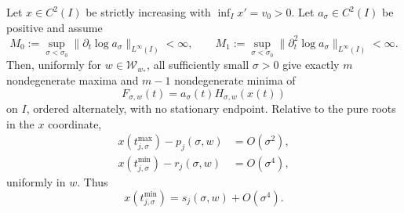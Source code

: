 \begin{theorem}
\label{thm:exactmfull-slow-factor}
Let \(x\in C^2(I)\) be strictly increasing with
\(\inf_Ix'=v_0>0\).  Let \(a_\sigma\in C^2(I)\) be positive and assume
\begin{equation}
 M_0:=\sup_{\sigma<\sigma_0}
 \|\partial_t\log a_\sigma\|_{L^\infty(I)}<\infty,
 \qquad
 M_1:=\sup_{\sigma<\sigma_0}
 \|\partial_t^2\log a_\sigma\|_{L^\infty(I)}<\infty.
 \label{eq:exactmfull-slow-factor-hypothesis}
\end{equation}
Then, uniformly for \(w\in\mathcal W_{w_*}\), all sufficiently small
\(\sigma>0\) give exactly \(m\) nondegenerate maxima and \(m-1\)
nondegenerate minima of
\begin{equation}
 F_{\sigma,w}(t)=a_\sigma(t)H_{\sigma,w}(x(t))
 \label{eq:exactmfull-slow-product}
\end{equation}
on \(I\), ordered alternately, with no stationary endpoint.  Relative to the
pure roots in the \(x\) coordinate,
\begin{align}
 x(t_{j,\sigma}^{\max})-p_j(\sigma,w)&=O(\sigma^2),
 \label{eq:exactmfull-slow-peak-shift}\\
 x(t_{j,\sigma}^{\min})-r_j(\sigma,w)&=O(\sigma^4),
 \label{eq:exactmfull-slow-valley-shift}
\end{align}
uniformly in \(w\).  Thus
\begin{equation}
 x(t_{j,\sigma}^{\min})=s_j(\sigma,w)+O(\sigma^4).
 \label{eq:exactmfull-slow-valley-location}
\end{equation}
\end{theorem}

